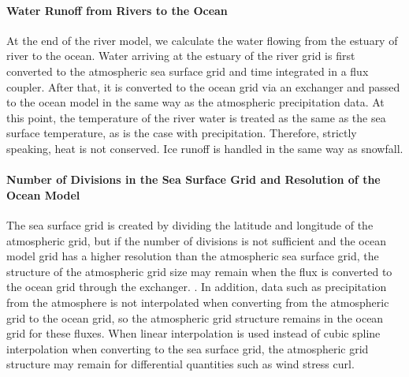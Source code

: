 \hypertarget{water-runoff-from-rivers-to-the-ocean}{%
\paragraph{Water Runoff from Rivers to the Ocean}\label{water-runoff-from-rivers-to-the-ocean}}

At the end of the river model, we calculate the water flowing from the estuary of river to the ocean. Water arriving at the estuary of the river grid is first converted to the atmospheric sea surface
grid and time integrated in a flux coupler. After that, it is converted to the ocean grid via an exchanger and passed to the ocean model in the same way as the atmospheric precipitation data. At this
point, the temperature of the river water is treated as the same as the sea surface temperature, as is the case with precipitation. Therefore, strictly speaking, heat is not conserved. Ice runoff is
handled in the same way as snowfall.

\hypertarget{number-of-divisions-in-the-sea-surface-grid-and-resolution-of-the-ocean-model}{%
\paragraph{Number of Divisions in the Sea Surface Grid and Resolution of the Ocean Model}\label{number-of-divisions-in-the-sea-surface-grid-and-resolution-of-the-ocean-model}}

The sea surface grid is created by dividing the latitude and longitude of the atmospheric grid, but if the number of divisions is not sufficient and the ocean model grid has a higher resolution than
the atmospheric sea surface grid, the structure of the atmospheric grid size may remain when the flux is converted to the ocean grid through the exchanger. . In addition, data such as precipitation
from the atmosphere is not interpolated when converting from the atmospheric grid to the ocean grid, so the atmospheric grid structure remains in the ocean grid for these fluxes. When linear
interpolation is used instead of cubic spline interpolation when converting to the sea surface grid, the atmospheric grid structure may remain for differential quantities such as wind stress curl.
